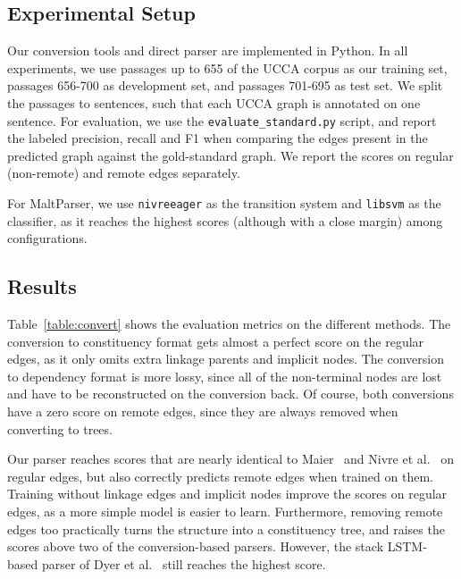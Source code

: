 \documentclass[11pt]{article}
\newcommand{\tabref}[1]{Table~\ref{#1}}
\begin{document}
\subsection{Experimental Setup}

Our conversion tools and direct parser are implemented in Python. In all experiments, we use passages up to 655 of the UCCA corpus as our training set, passages 656-700 as development set, and passages 701-695 as test set. We split the passages to sentences, such that each UCCA graph is annotated on one sentence.
For evaluation, we use the \texttt{evaluate\_standard.py} script, and report the labeled precision, recall and F1 when comparing the edges present in the predicted graph against the gold-standard graph. We report the scores on regular (non-remote) and remote edges separately.

For MaltParser, we use \texttt{nivreeager} as the transition system and \texttt{libsvm} as the classifier, as it reaches the highest scores (although with a close margin) among configurations.

\subsection{Results}

\tabref{table:convert} shows the evaluation metrics on the different methods.
The conversion to constituency format gets almost a perfect score on the regular edges, as it only omits extra linkage parents and implicit nodes. The conversion to dependency format is more lossy, since all of the non-terminal nodes are lost and have to be reconstructed on the conversion back. Of course, both conversions have a zero score on remote edges, since they are always removed when converting to trees.

Our parser reaches scores that are nearly identical to Maier~ and Nivre et al.~ on regular edges, but also correctly predicts remote edges when trained on them.
Training without linkage edges and implicit nodes improve the scores on regular edges, as a more simple model is easier to learn. Furthermore, removing remote edges too practically turns the structure into a constituency tree, and raises the scores above two of the conversion-based parsers. However, the stack LSTM-based parser of Dyer et al.~ still reaches the highest score.
\end{document}
